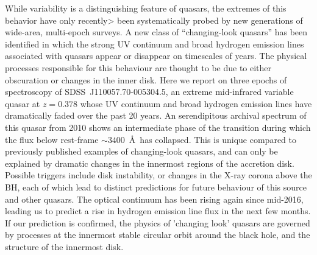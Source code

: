 While variability is a distinguishing feature of quasars, the extremes
of this behavior have only recently> been systematically probed by new
generations of wide-area, multi-epoch surveys.  A new class of
``changing-look quasars'' has been identified in which the strong UV
continuum and broad hydrogen emission lines associated with quasars
appear or disappear on timescales of years.  The physical processes
responsible for this behaviour are thought to be due to either
obscuration or changes in the inner disk.  Here we report on three
epochs of spectroscopy of SDSS~J110057.70-005304.5, an extreme
mid-infrared variable quasar at $z = 0.378$ whose UV continuum and
broad hydrogen emission lines have dramatically faded over the past 20
years.  An serendipitous archival spectrum of this quasar from 2010
shows an intermediate phase of the transition during which the flux
below rest-frame $\sim 3400$~\AA\ has collapsed.  This is unique
compared to previously published examples of changing-look quasars,
and can only be explained by dramatic changes in the innermost regions
of the accretion disk. Possible triggers include disk instability, or
changes in the X-ray corona above the BH, each of which lead to
distinct predictions for future behaviour of this source and other
quasars. The optical continuum has been rising again since mid-2016,
leading us to predict a rise in hydrogen emission line flux in the
next few months.  If our prediction is confirmed, the physics of
'changing look' quasars are governed by processes at the innermost
stable circular orbit around the black hole, and the structure of the
innermost disk.